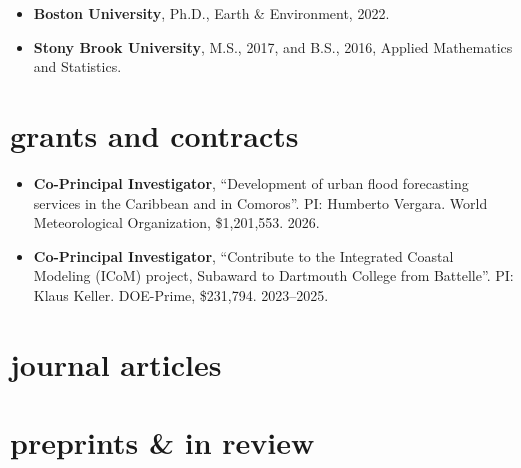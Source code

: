 \documentclass[10pt,oneside]{article}
\begin{document}
\mbox{}\vspace{-\dimexpr\baselineskip\relax}

\begin{itemize}[label={}]

  \item \textbf{Boston University}, Ph.D., Earth \& Environment, 2022.

  \item \textbf{Stony Brook University}, M.S., 2017, and B.S., 2016, Applied Mathematics and Statistics.

\end{itemize}


\section{grants and contracts}

\mbox{}\vspace{-\dimexpr\baselineskip\relax}

\begin{itemize}[label={}]
  
  \item \textbf{Co-Principal Investigator}, \enquote{Development of urban flood forecasting services in the Caribbean and in Comoros}.  PI: Humberto Vergara. {World Meteorological Organization}, \$1,201,553. 2026.
        
  \item \textbf{Co-Principal Investigator}, \enquote{Contribute to the Integrated Coastal Modeling (ICoM) project, Subaward to Dartmouth College from Battelle}.  PI: Klaus Keller. {DOE-Prime}, \$231,794. 2023--2025.
        
\end{itemize}


\section{journal articles}

\mbox{}\vspace{-\dimexpr\baselineskip\relax}
\vspace*{-1em}

\uspunctuation

\printbibliography[type=article, heading=none]

\section{preprints \& in review}
\end{document}
